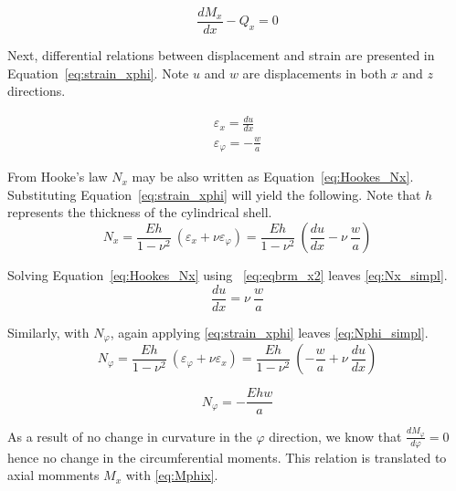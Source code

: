 \begin{equation}
	\label{eq:eqbrm_y2}
	\frac{dM_x}{dx}- Q_x= 0
\end{equation} 

Next, differential relations between displacement and strain are presented in Equation~\ref{eq:strain_xphi}. Note $u$ and $w$ are displacements in both $x$ and $z$ directions.

\begin{equation}
	\label{eq:strain_xphi}
	\begin{aligned}
		\varepsilon_x = \frac{du}{dx}      \\
		\varepsilon_\varphi = -\frac{w}{a} 
	\end{aligned}
\end{equation}

From Hooke's law $N_x$ may be also written as Equation~\ref{eq:Hookes_Nx}. Substituting Equation~\ref{eq:strain_xphi} will yield the following. Note that $h$ represents the thickness of the cylindrical shell.
\begin{equation}
	\label{eq:Hookes_Nx}
	N_x = \frac{Eh}{1-\nu^2}\ \left( \varepsilon_x + \nu \varepsilon_\varphi \right) =  \frac{Eh}{1-\nu^2}\ \left( \frac{du}{dx} -\nu \ \frac{w}{a} \right)
\end{equation} 

Solving Equation~\ref{eq:Hookes_Nx} using ~\ref{eq:eqbrm_x2} leaves \ref{eq:Nx_simpl}.
\begin{equation}
	\label{eq:Nx_simpl}
	\frac{du}{dx} =  \nu \ \frac{w}{a}
\end{equation} 

Similarly, with $N_\varphi$, again applying \ref{eq:strain_xphi} leaves \ref{eq:Nphi_simpl}.
\begin{equation}
	\label{eq:Hookes_Nphi}
	N_\varphi = \frac{Eh}{1-\nu^2}\ \left( \varepsilon_\varphi + \nu \varepsilon_x \right) = \frac{Eh}{1-\nu^2}\  \left( -\frac{w}{a}+\nu \ \frac{du}{dx} \right)
\end{equation} 

\begin{equation}
	\label{eq:Nphi_simpl}
	N_\varphi = - \frac{Ehw}{a}
\end{equation}

As a result of no change in curvature in the $\varphi$ direction, we know that $\frac{dM_\varphi}{d\varphi}= 0$ hence no change in the circumferential moments. This relation is translated to axial momments $M_x$ with \ref{eq:Mphix}.

